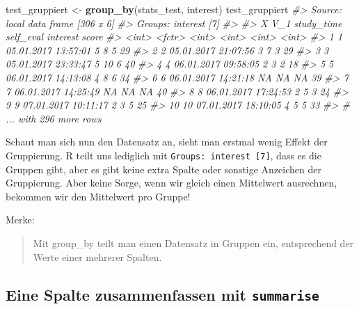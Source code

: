 \documentclass[12pt,]{book}
\newenvironment{Shaded}{\begin{snugshade}}{\end{snugshade}}
\newcommand{\KeywordTok}[1]{\textcolor[rgb]{0.13,0.29,0.53}{\textbf{{#1}}}}
\newcommand{\StringTok}[1]{\textcolor[rgb]{0.31,0.60,0.02}{{#1}}}
\newcommand{\CommentTok}[1]{\textcolor[rgb]{0.56,0.35,0.01}{\textit{{#1}}}}
\newcommand{\NormalTok}[1]{{#1}}
\begin{document}
\begin{Shaded}
\begin{Highlighting}[]
\NormalTok{test_gruppiert <-}\StringTok{ }\KeywordTok{group_by}\NormalTok{(stats_test, interest)}
\NormalTok{test_gruppiert}
\CommentTok{#> Source: local data frame [306 x 6]}
\CommentTok{#> Groups: interest [7]}
\CommentTok{#> }
\CommentTok{#>        X                 V_1 study_time self_eval interest score}
\CommentTok{#>    <int>              <fctr>      <int>     <int>    <int> <int>}
\CommentTok{#> 1      1 05.01.2017 13:57:01          5         8        5    29}
\CommentTok{#> 2      2 05.01.2017 21:07:56          3         7        3    29}
\CommentTok{#> 3      3 05.01.2017 23:33:47          5        10        6    40}
\CommentTok{#> 4      4 06.01.2017 09:58:05          2         3        2    18}
\CommentTok{#> 5      5 06.01.2017 14:13:08          4         8        6    34}
\CommentTok{#> 6      6 06.01.2017 14:21:18         NA        NA       NA    39}
\CommentTok{#> 7      7 06.01.2017 14:25:49         NA        NA       NA    40}
\CommentTok{#> 8      8 06.01.2017 17:24:53          2         5        3    24}
\CommentTok{#> 9      9 07.01.2017 10:11:17          2         3        5    25}
\CommentTok{#> 10    10 07.01.2017 18:10:05          4         5        5    33}
\CommentTok{#> # ... with 296 more rows}
\end{Highlighting}
\end{Shaded}

Schaut man sich nun den Datensatz an, sieht man erstmal wenig Effekt der
Gruppierung. R teilt uns lediglich mit
\texttt{Groups:\ interest\ {[}7{]}}, dass es die Gruppen gibt, aber es
gibt keine extra Spalte oder sonstige Anzeichen der Gruppierung. Aber
keine Sorge, wenn wir gleich einen Mittelwert ausrechnen, bekommen wir
den Mittelwert pro Gruppe!

Merke:

\begin{quote}
Mit group\_by teilt man einen Datensatz in Gruppen ein, entsprechend der
Werte einer mehrerer Spalten.
\end{quote}

\subsection{\texorpdfstring{Eine Spalte zusammenfassen mit
\texttt{summarise}}{Eine Spalte zusammenfassen mit summarise}}\label{eine-spalte-zusammenfassen-mit-summarise}
\end{document}
